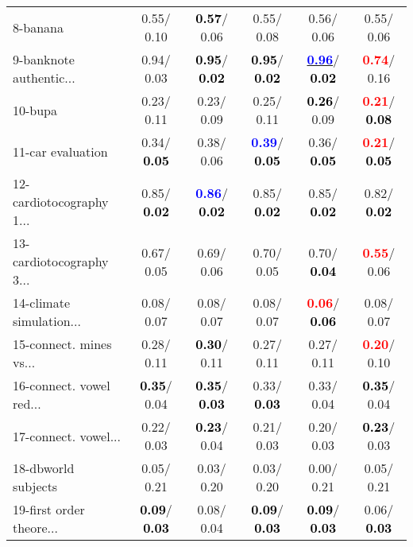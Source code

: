 \begin{table}[h]
\begin{center}
\begin{tabular}{lc|c|c|c|c}
8-banana &   0.55/  0.10 & \textcolor{black}{\textbf{  0.57}}/  0.06 &   0.55/  0.08 &   0.56/  0.06 &   0.55/  0.06 \\
9-banknote authentic... &   0.94/  0.03 & \textcolor{black}{\textbf{  0.95}}/\textcolor{black}{\textbf{  0.02}} & \textcolor{black}{\textbf{  0.95}}/\textcolor{black}{\textbf{  0.02}} & \underline{\textcolor{blue}{\textbf{  0.96}}}/\textcolor{black}{\textbf{  0.02}} & \textcolor{red}{\textbf{  0.74}}/  0.16 \\
10-bupa &   0.23/  0.11 &   0.23/  0.09 &   0.25/  0.11 & \textcolor{black}{\textbf{  0.26}}/  0.09 & \textcolor{red}{\textbf{  0.21}}/\textcolor{black}{\textbf{  0.08}} \\
11-car evaluation &   0.34/\textcolor{black}{\textbf{  0.05}} &   0.38/  0.06 & \textcolor{blue}{\textbf{  0.39}}/\textcolor{black}{\textbf{  0.05}} &   0.36/\textcolor{black}{\textbf{  0.05}} & \textcolor{red}{\textbf{  0.21}}/\textcolor{black}{\textbf{  0.05}} \\
12-cardiotocography 1... &   0.85/\textcolor{black}{\textbf{  0.02}} & \textcolor{blue}{\textbf{  0.86}}/\textcolor{black}{\textbf{  0.02}} &   0.85/\textcolor{black}{\textbf{  0.02}} &   0.85/\textcolor{black}{\textbf{  0.02}} &   0.82/\textcolor{black}{\textbf{  0.02}} \\
13-cardiotocography 3... &   0.67/  0.05 &   0.69/  0.06 &   0.70/  0.05 &   0.70/\textcolor{black}{\textbf{  0.04}} & \textcolor{red}{\textbf{  0.55}}/  0.06 \\
14-climate simulation... &   0.08/  0.07 &   0.08/  0.07 &   0.08/  0.07 & \textcolor{red}{\textbf{  0.06}}/\textcolor{black}{\textbf{  0.06}} &   0.08/  0.07 \\ \hline
15-connect. mines vs... &   0.28/  0.11 & \textcolor{black}{\textbf{  0.30}}/  0.11 &   0.27/  0.11 &   0.27/  0.11 & \textcolor{red}{\textbf{  0.20}}/  0.10 \\
16-connect. vowel red... & \textcolor{black}{\textbf{  0.35}}/  0.04 & \textcolor{black}{\textbf{  0.35}}/\textcolor{black}{\textbf{  0.03}} &   0.33/\textcolor{black}{\textbf{  0.03}} &   0.33/  0.04 & \textcolor{black}{\textbf{  0.35}}/  0.04 \\
17-connect. vowel... &   0.22/  0.03 & \textcolor{black}{\textbf{  0.23}}/  0.04 &   0.21/  0.03 &   0.20/  0.03 & \textcolor{black}{\textbf{  0.23}}/  0.03 \\
18-dbworld subjects &   0.05/  0.21 &   0.03/  0.20 &   0.03/  0.20 &   0.00/  0.21 &   0.05/  0.21 \\
19-first order theore... & \textcolor{black}{\textbf{  0.09}}/\textcolor{black}{\textbf{  0.03}} &   0.08/  0.04 & \textcolor{black}{\textbf{  0.09}}/\textcolor{black}{\textbf{  0.03}} & \textcolor{black}{\textbf{  0.09}}/\textcolor{black}{\textbf{  0.03}} &   0.06/\textcolor{black}{\textbf{  0.03}} \\

\end{tabular}
\end{center}
\end{table}
